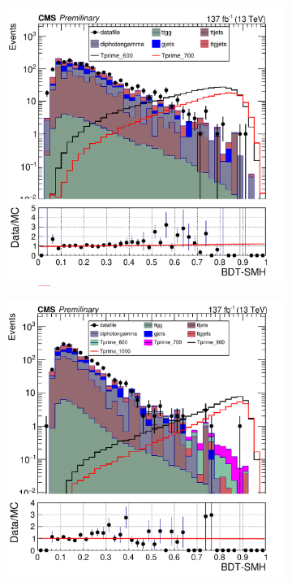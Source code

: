 \begin{figure}[H]
     \centering
     \begin{subfigure}[b]{0.3\textwidth}
         \centering
         \includegraphics[width=\textwidth]{BDT_Output/Stacked_plot_BDT_600-700_with_diphoton_cuts_with_scaled_inputs.pdf}
         \label{fig:y equals x}
     \end{subfigure}
     \hfill
     \begin{subfigure}[b]{0.3\textwidth}
         \centering
         \includegraphics[width=\textwidth]{BDT_Output/Stacked_plot_BDT_800-1000_with_diphoton_cuts_with_Scaled_inputs.pdf}

\end{subfigure}
\end{figure}
